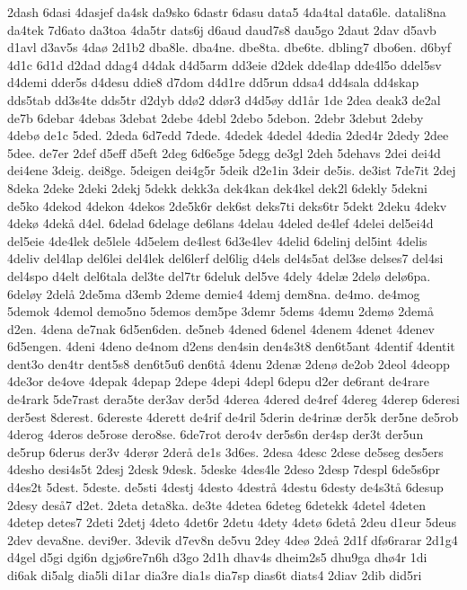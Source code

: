 {2dash
6dasi
4dasjef
da4sk
da9sko
6dastr
6dasu
data5
4da4tal
data6le.
datali8na
da4tek
7d6ato
da3toa
4da5tr
dats6j
d6aud
daud7s8
dau5go
2daut
2dav
d5avb
d1avl
d3av5s
4da^^f8
2d1b2
dba8le.
dba4ne.
dbe8ta.
dbe6te.
dbling7
dbo6en.
d6byf
4d1c
6d1d
d2dad
ddag4
d4dak
d4d5arm
dd3eie
d2dek
dde4lap
dde4l5o
ddel5sv
d4demi
dder5s
d4desu
ddie8
d7dom
d4d1re
dd5run
ddsa4
dd4sala
dd4skap
dds5tab
dd3s4te
dds5tr
d2dyb
dd^^f82
dd^^f8r3
d4d5^^f8y
dd1^^e5r
1de
2dea
deak3
de2al
de7b
6debar
4debas
3debat
2debe
4debl
2debo
5debon.
2debr
3debut
2deby
4deb^^f8
de1c
5ded.
2deda
6d7edd
7dede.
4dedek
4dedel
4dedia
2ded4r
2dedy
2dee
5dee.
de7er
2def
d5eff
d5eft
2deg
6d6e5ge
5degg
de3gl
2deh
5dehavs
2dei
dei4d
dei4ene
3deig.
dei8ge.
5deigen
dei4g5r
5deik
d2e1in
3deir
de5is.
de3ist
7de7it
2dej
8deka
2deke
2deki
2dekj
5dekk
dekk3a
dek4kan
dek4kel
dek2l
6dekly
5dekni
de5ko
4dekod
4dekon
4dekos
2de5k6r
dek6st
deks7ti
deks6tr
5dekt
2deku
4dekv
4dek^^f8
4dek^^e5
d4el.
6delad
6delage
de6lans
4delau
4deled
de4lef
4delei
del5ei4d
del5eie
4de4lek
de5lele
4d5elem
de4lest
6d3e4lev
4delid
6delinj
del5int
4delis
4deliv
del4lap
del6lei
del4lek
del6lerf
del6lig
d4els
del4s5at
del3se
delses7
del4si
del4spo
d4elt
del6tala
del3te
del7tr
6deluk
del5ve
4dely
4del^^e6
2del^^f8
del^^f86pa.
6del^^f8y
2del^^e5
2de5ma
d3emb
2deme
demie4
4demj
dem8na.
de4mo.
de4mog
5demok
4demol
demo5no
5demos
dem5pe
3demr
5dems
4demu
2dem^^f8
2dem^^e5
d2en.
4dena
de7nak
6d5en6den.
de5neb
4dened
6denel
4denem
4denet
4denev
6d5engen.
4deni
4deno
de4nom
d2ens
den4sin
den4s3t8
den6t5ant
4dentif
4dentit
dent3o
den4tr
dent5s8
den6t5u6
den6t^^e5
4denu
2den^^e6
2den^^f8
de2ob
2deol
4deopp
4de3or
de4ove
4depak
4depap
2depe
4depi
4depl
6depu
d2er
de6rant
de4rare
de4rark
5de7rast
dera5te
der3av
der5d
4derea
4dered
de4ref
4dereg
4derep
6deresi
der5est
8derest.
6dereste
4derett
de4rif
de4ril
5derin
de4rin^^e6
der5k
der5ne
de5rob
4derog
4deros
de5rose
dero8se.
6de7rot
dero4v
der5s6n
der4sp
der3t
der5un
de5rup
6derus
der3v
4der^^f8r
2der^^e5
de1s
3d6es.
2desa
4desc
2dese
de5seg
des5ers
4desho
desi4s5t
2desj
2desk
9desk.
5deske
4des4le
2deso
2desp
7despl
6de5s6pr
d4es2t
5dest.
5deste.
de5sti
4destj
4desto
4destr^^e5
4destu
6desty
de4s3t^^e5
6desup
2desy
des^^e57
d2et.
2deta
deta8ka.
de3te
4detea
6deteg
6detekk
4detel
4deten
4detep
detes7
2deti
2detj
4deto
4det6r
2detu
4dety
4det^^f8
6det^^e5
2deu
d1eur
5deus
2dev
deva8ne.
devi9er.
3devik
d7ev8n
de5vu
2dey
4de^^f8
2de^^e5
2d1f
df^^f86rarar
2d1g4
d4gel
d5gi
dgi6n
dgj^^f86re7n6h
d3go
2d1h
dhav4s
dheim2s5
dhu9ga
dh^^f84r
1di
di6ak
di5alg
dia5li
di1ar
dia3re
dia1s
dia7sp
dias6t
diats4
2diav
2dib
did5ri
}
